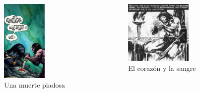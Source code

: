 \begin{frame}{}
\begin{columns}
    \begin{figure}[htb]
    \centering
        \includegraphics[width=0.55\textwidth]{img/res/17}
        \caption{Una muerte piadosa}
    \end{figure}
    \begin{figure}[htb]
    \centering
        \includegraphics[width=0.7\textwidth]{img/res/18}
        \caption{El corazón y la sangre}
    \end{figure}
\end{columns}
\end{frame}

